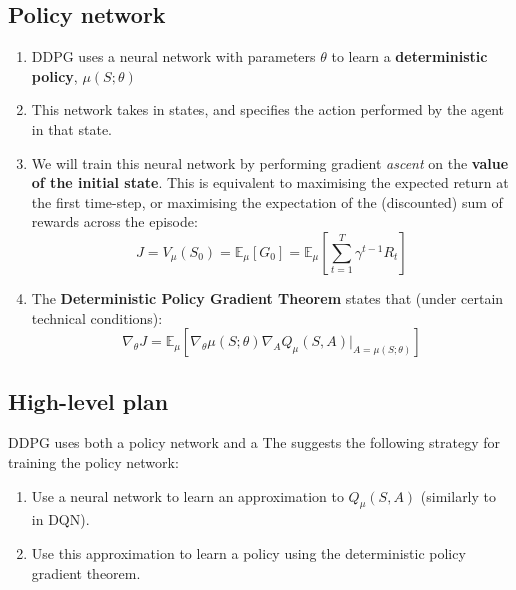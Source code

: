 \documentclass[]{article}
\newcommand{\E}{\mathbb{E}}
\begin{document}
\subsection*{Policy network}
\begin{enumerate}
	\item DDPG uses a neural network with parameters $\theta$ to learn a \textbf{deterministic policy}, $\mu(S;\theta)$
	\item This network takes in states, and specifies the action performed by the agent in that state. 
	\item We will train this neural network by performing gradient \emph{ascent} on the \textbf{value of the initial state}. This is equivalent to maximising the expected return at the first time-step, or maximising the expectation of the (discounted) sum of rewards across the episode:
	\begin{equation}
		J = V_\mu(S_0) = \E_\mu[G_0] = \E_\mu\left[  \sum_{t=1}^T \gamma^{t-1} R_t \right] 
	\end{equation}
	\item The \textbf{Deterministic Policy Gradient Theorem} states that (under certain technical conditions):
	\begin{equation}\label{eq:Deterministic policy gradient theorem}
		\nabla_\theta J = \E_\mu\left[ \nabla_\theta \mu(S;\theta) \nabla_A Q_\mu(S,A) |_{A = \mu(S;\theta)}  \right]
	\end{equation}
\end{enumerate}

\subsection*{High-level plan}
DDPG uses both a policy network and a 
The suggests the following strategy for training the policy network:
\begin{enumerate}
	\item Use a neural network to learn an approximation to $Q_\mu(S,A)$ (similarly to in DQN).
	\item Use this approximation to learn a policy using the deterministic policy gradient theorem. 
\end{enumerate}


\fi
\end{document}
